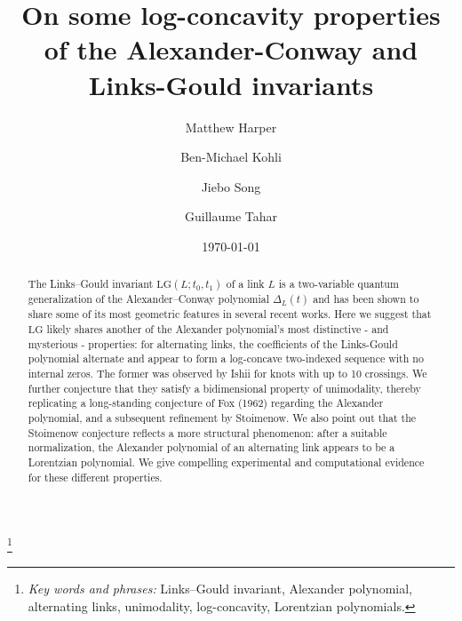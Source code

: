 \documentclass[12pt,reqno]{amsart}
\theoremstyle{definition}
\def\LG{\mathrm{LG}}
\begin{document}
\title[On some log-concavity properties of the Alexander and $\LG$ invariants]{On some log-concavity properties of the Alexander-Conway and Links-Gould invariants}


\author[M. Harper]{Matthew Harper}
\address{Michigan State University, East Lansing, Michigan, USA}
   
\author[B.-M. Kohli]{Ben-Michael Kohli}
\address{Section de Math\'ematiques, Universit\'e de Gen\`eve \\
rue du Conseil-G\'en\'eral 7-9, 1205 Gen\`eve, Switzerland}

\author[J. Song]{Jiebo Song}
\address{Beijing Institute of Mathematical Sciences and Applications,
  Huairou District, Beijing, China}

\author[G. Tahar]{Guillaume Tahar}
\address{Beijing Institute of Mathematical Sciences and Applications,
  Huairou District, Beijing, China}


\thanks{
  {\em Key words and phrases:}
  Links--Gould invariant, Alexander polynomial, alternating links, unimodality, log-concavity, Lorentzian polynomials.
}

\date{\today }

\begin{abstract}
The Links--Gould invariant $\LG(L ; t_0, t_1)$ of a link $L$ is a two-variable quantum generalization of the Alexander--Conway polynomial $\Delta_L(t)$ and has been shown to share some of its most geometric features in several recent works. Here we suggest that $\LG$ likely shares another of the Alexander polynomial’s most distinctive - and mysterious - properties: for alternating links, the coefficients of the Links-Gould polynomial alternate and appear to form a log-concave two-indexed sequence with no internal zeros. The former was observed by Ishii for knots with up to 10 crossings. We further conjecture that they satisfy a bidimensional property of unimodality, thereby replicating a long-standing conjecture of Fox (1962) regarding the Alexander polynomial, and a subsequent refinement by Stoimenow. We also point out that the Stoimenow conjecture reflects a more structural phenomenon: after a suitable normalization, the Alexander polynomial of an alternating link appears to be a Lorentzian polynomial. We give {compelling} experimental and computational evidence for these different properties.
\end{abstract}

\maketitle
\end{document}

